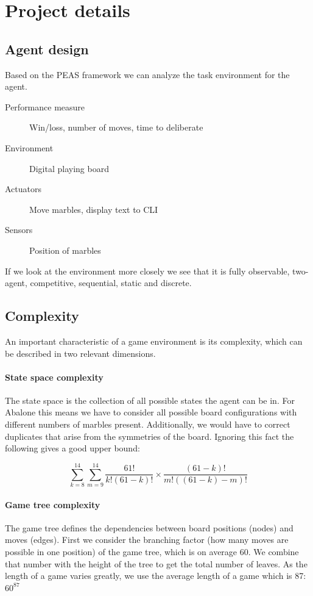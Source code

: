 \documentclass{../llncs}
\begin{document}
\section{Project details}

\subsection{Agent design}

Based on the PEAS framework we can analyze the task environment for the agent. \cite[p.107]{russell_artificial_2021}

\begin{description}
	\item[Performance measure] Win/loss, number of moves, time to deliberate
	\item[Environment] Digital playing board
	\item[Actuators] Move marbles, display text to CLI
	\item[Sensors] Position of marbles
\end{description}

If we look at the environment more closely we see that it is fully observable, two-agent, competitive, sequential, static and discrete.

\subsection{Complexity}
An important characteristic of a game environment is its complexity, which can be described in two relevant dimensions.

\paragraph{State space complexity}

The state space is the collection of all possible states the agent can be in.\cite[p. 150]{russell_artificial_2021} For Abalone this means we have to consider all possible board configurations with different numbers of marbles present. Additionally, we would have to correct duplicates that arise from the symmetries of the board. Ignoring this fact the following gives a good upper bound:

$$
	\sum_{k=8}^{14}\sum_{m=9}^{14}\frac{61!}{k!(61-k)!}\times\frac{(61-k)!}{m!((61-k)-m)!}
$$

\paragraph{Game tree complexity} The game tree defines the dependencies between board positions (nodes) and moves (edges). First we consider the branching factor (how many moves are possible in one position) of the game tree, which is on average 60. We combine that number with the height of the tree to get the total number of leaves. As the length of a game varies greatly, we use the average length of a game which is 87: $60^{87}$ \cite{lemmens_constructing_2005}
\end{document}
